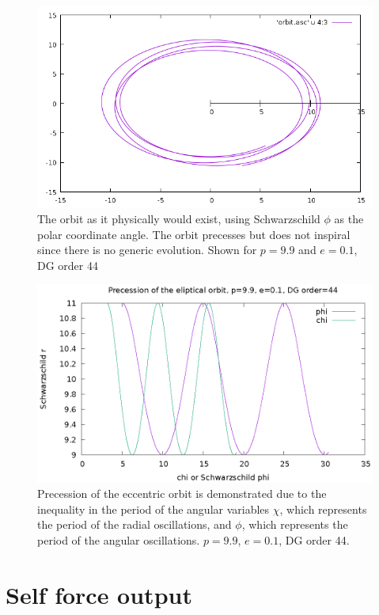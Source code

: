 \begin{figure}
  \includegraphics{orbitevolvedg44p99e01}
  \caption{The orbit as it physically would exist, using Schwarzschild $\phi$ as the polar coordinate angle. The orbit precesses but does not inspiral since there is no generic evolution. Shown for $p=9.9$ and $e=0.1$, DG order 44}
  \label{phiorb}
\end{figure}


\begin{figure}
  \includegraphics{precessiondg44p99e01}
  \caption{Precession of the eccentric orbit is demonstrated due to the inequality in the period of the angular variables $\chi$, which represents the period of the radial oscillations, and $\phi$, which represents the period of the angular oscillations. $p=9.9$, $e=0.1$, DG order 44.}
  \label{precession}
\end{figure}

\section{Self force output}

